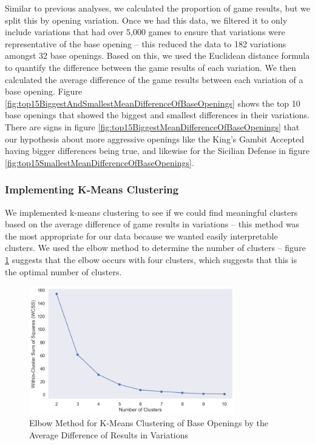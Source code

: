 \documentclass[a4paper, 11pt]{article}
\begin{document}
Similar to previous analyses, we calculated the proportion of game results, but we split this by opening variation. Once we had this data, we filtered it to only include variations that had over 5,000 games to ensure that variations were representative of the base opening -- this reduced the data to 182 variations amongst 32 base openings. Based on this, we used the Euclidean distance formula to quantify the difference between the game results of each variation. We then calculated the average difference of the game results between each variation of a base opening. Figure \ref{fig:top15BiggestAndSmallestMeanDifferenceOfBaseOpenings} shows the top 10 base openings that showed the biggest and smallest differences in their variations. There are signs in figure \ref{fig:top15BiggestMeanDifferenceOfBaseOpenings} that our hypothesis about more aggressive openings like the King's Gambit Accepted having bigger differences being true, and likewise for the Sicilian Defense in figure \ref{fig:top15SmallestMeanDifferenceOfBaseOpenings}.

\subsubsection{Implementing K-Means Clustering}

We implemented k-means clustering to see if we could find meaningful clusters based on the average difference of game results in variations -- this method was the most appropriate for our data because we wanted easily interpretable clusters. We used the elbow method to determine the number of clusters -- figure \ref{fig:elbowMethodForBaseOpeningsClusteredByDifferenceInVariations} suggests that the elbow occurs with four clusters, which suggests that this is the optimal number of clusters.

\begin{figure}[H]
    \centering
    \caption{Elbow Method for K-Means Clustering of Base Openings by the Average Difference of Results in Variations}
    \label{fig:elbowMethodForBaseOpeningsClusteredByDifferenceInVariations}
    \includegraphics[width=0.8\textwidth]{Elbow Method for Clustering of Base Opening by Difference in Variations.png}
\end{figure}
\end{document}
